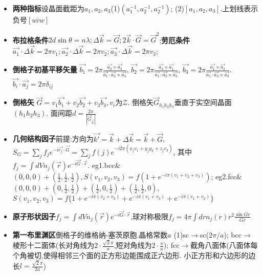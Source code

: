 \documentclass[UTF8,a4paper,1pt,twocolumn]{ctexart}
\begin{document}
\begin{itemize}
  \item \textbf{两种指标}设晶面截距为$a_1,a_2,a_3$(1)$(a_1^{-1},a_{2}^{-1},a_2^{-1})$;
  (2)$[a_1,a_2,a_3]$.上划线表示负号$[u\overline{v}w]$
  
  \item \textbf{布拉格条件}$2d\sin{\theta}=n\lambda;\Delta\vec{k}=\vec{G};2\vec{k}\cdot\vec{G}=\vec{G}^2$;\textbf{劳厄条件}$\vec{a_1}\cdot\Delta\vec{k}=2\pi v_1;\vec{a_2}\cdot\Delta\vec{k}=2\pi v_2;\vec{a_3}\cdot\Delta\vec{k}=2\pi v_3$;
  
  \item \textbf{倒格子初基平移矢量}
  $\vec{b_1}=2\pi\frac{\vec{a_2}\times\vec{a_3}}{\vec{a_1}\cdot\vec{a_2}\times\vec{a_3}}$,
  $\vec{b_2}=2\pi\frac{\vec{a_3}\times\vec{a_1}}{\vec{a_1}\cdot\vec{a_2}\times\vec{a_3}}$,
  $\vec{b_3}=2\pi\frac{\vec{a_1}\times\vec{a_2}}{\vec{a_1}\cdot\vec{a_2}\times\vec{a_3}}$.
  $\vec{b_i}\cdot\vec{a_j}=2\pi\delta_{ij}$
  
  \item \textbf{倒格矢}
  $\vec{G}=v_1\vec{b_1}+v_2\vec{b_2}+v_3\vec{b_3},v_{i}为\mathcal{Z}$.
  倒格矢$\vec{G}_{h_1h_2h_3}$垂直于实空间晶面$(h_1h_2h_3)$.
  面间距$d=\frac{2\pi }{|\vec{G}_{\vec{h}}|}$

  \item \textbf{几何结构因子}前提:方向为$\vec{k'}=\vec{k}+\Delta\vec{k}=\vec{k}+\vec{G}$,
  $S_{G}=\sum_{j} f_{j}e^{-i\vec{r_{j}}\cdot\vec{G}}=\sum_{j}f(j)e^{-i2\pi(x_j v_1+y_j y_2+z_j v_3)}$,
  其中$f_{j}=\int dVn_{j}(\vec{r})e^{-i\vec{G}\cdot\vec{r}}$.
  eg1.bcc$\&$$(0,0,0)+(\frac{1}{2},\frac{1}{2},\frac{1}{2}),S(v_1,v_2,v_3)=f(1+e^{-i\pi(v_1+v_2+v_3)})$;
  eg2.fcc$\&$$(0,0,0)+(0,\frac{1}{2},\frac{1}{2})+(\frac{1}{2},0,\frac{1}{2})+(\frac{1}{2},\frac{1}{2},0)$,
  $S(v_1,v_2,v_3)=f\{1+e^{-i\pi(v_2+v_3)}+e^{-i\pi(v_1+v_3)}+e^{-i\pi(v_1+v_2)}\}$
  \item \textbf{原子形状因子}$f_j=\int dVn_j(\vec{r})e^{-i\vec{G}\cdot\vec{r}}$,球对称极限$f_j=4\pi\int drn_j(r)r^2\frac{\sin{Gr}}{Gr}$
  
  \item \textbf{第一布里渊区}倒格子的维格纳-塞茨原胞.晶格常数$a$
  (1)sc$\rightarrow$sc($2\pi/a$);
  bcc$\rightarrow$棱形十二面体(长对角线为$2\cdot\frac{\sqrt{2}\pi}{a}$,短对角线为$2\cdot\frac{\pi}{a}$);
  fcc$\rightarrow$截角八面体(八面体每个角被切,使得相邻三个面的正方形边能围成正六边形.
  小正方形和六边形的边长$l=\frac{\sqrt{2}\pi}{2a}$)


\end{itemize}
\end{document}
